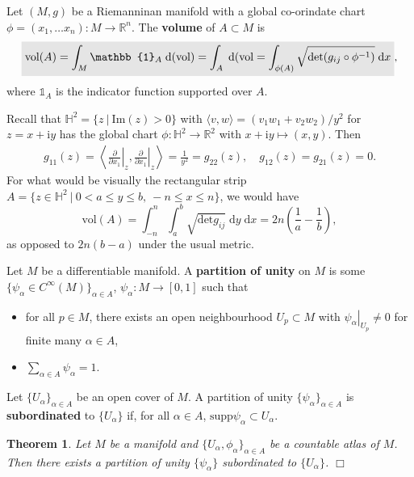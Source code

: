 \documentclass[letter-paper]{tufte-book}
\newtheorem{theorem}{\color{pastel-blue}Theorem}[section]
\newenvironment{example}[1][Example]{\begin{trivlist}
\item[\hskip \labelsep {\bfseries #1}]}{\end{trivlist}}
\newcommand{\qedwhite}{\hfill \ensuremath{\Box}}
\newcommand{\highlight}[1]{\mathchoice%
  {\colorbox{black!10}{$\displaystyle#1$}}%
  {\colorbox{black!10}{$\textstyle#1$}}%
  {\colorbox{black!10}{$\scriptstyle#1$}}%
  {\colorbox{black!10}{$\scriptscriptstyle#1$}}}%
\begin{document}
Let $(M,g)$ be a Riemanninan manifold with a global co-orindate chart $\phi = (x_1, \ldots x_n) : M \to \mathbb{R}^n$. The \textbf{volume} of $A \subset M$ is
\begin{equation}
  \highlight{\mbox{vol}(A) = \int_M \mathbb{1}_A\; \mathrm{d}(\mbox{vol}) = \int_A\; \mathrm{d}(\mbox{vol} = \int_{\phi(A)}\sqrt{\mbox{det}(g_{ij} \circ \phi^{-1})}\; \mathrm{d}x},
\end{equation}
where $\mathbb{1}_A$ is the indicator function supported over $A$.

\begin{example}
  Recall that $\mathbb{H}^2 = \{z\ |\ \mbox{Im}(z)>0\}$ with $\langle v,w\rangle = (v_1 w_1 + v_2 w_2) / y^2$ for $z=x+\mathrm{i}y$ has the global chart $\phi : \mathbb{H}^2 \to \mathbb{R}^2$ with $x+\mbox{i}y \mapsto (x,y)$. Then
  \begin{align*}
      g_{11}(z) = \left\langle \left.\frac{\partial}{\partial x_1}\right|_z, \left.\frac{\partial}{\partial x_1}\right|_z \right\rangle = \frac{1}{y^2} = g_{22}(z),\quad g_{12}(z) = g_{21}(z) = 0.
  \end{align*}
  For what would be visually the rectangular strip $A = \{z\in \mathbb{H}^2\ |\ 0 < a \leq y \leq b,\ -n \leq x \leq n\}$, we would have
  \begin{equation*}
    \mbox{vol}(A) = \int_{-n}^n \int_a^b \sqrt{\mbox{det}g_{ij}}\; \mathrm{d}y\; \mathrm{d}x = 2n\left(\frac{1}{a} - \frac{1}{b}\right),
  \end{equation*}
  as opposed to $2n(b-a)$ under the usual metric.
\end{example}

Let $M$ be a differentiable manifold. A \textbf{partition of unity} on $M$ is some $\{\psi_\alpha \in C^\infty(M)\}_{\alpha\in A}$, $\psi_\alpha : M \to [0, 1]$ such that
\begin{itemize}
  \item for all $p\in M$, there exists an open neighbourhood $U_p \subset M$ with $\left.\psi_\alpha\right|_{U_p} \neq 0$ for finite many $\alpha \in A$,
  \item $\sum_{\alpha \in A} \psi_\alpha = 1$.
\end{itemize}
Let $\{U_\alpha\}_{\alpha \in A}$ be an open cover of $M$. A partition of unity $\{\psi_\alpha\}_{\alpha \in A}$ is \textbf{subordinated} to $\{U_\alpha\}$ if, for all $\alpha \in A$, $\mbox{supp} \psi_\alpha \subset U_\alpha$.

\begin{theorem}
  Let $M$ be a manifold and $\{U_\alpha, \phi_\alpha\}_{\alpha \in A}$ be a countable atlas of $M$. Then there exists a partition of unity $\{\psi_\alpha\}$ subordinated to $\{U_\alpha\}$. \qedwhite
\end{theorem}
\end{document}
